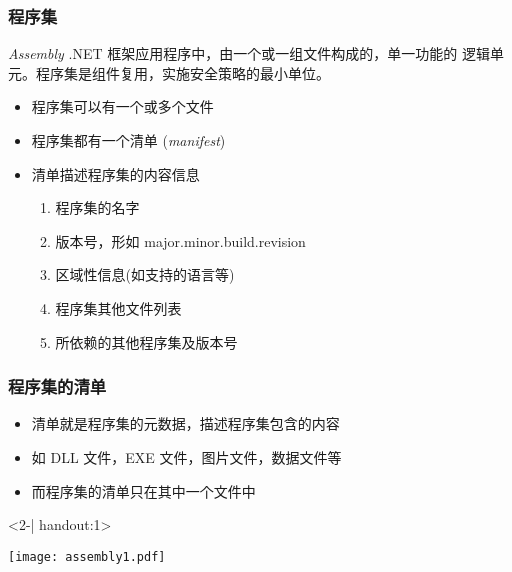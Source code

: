 \begin{frame}
\frametitle{程序集}
\begin{block}{\textit{Assembly}}
  \CJKindent \small .NET 框架应用程序中，由一个或一组文件构成的，单一功能的
  逻辑单元。程序集是组件复用，实施安全策略的最小单位。
\end{block}
\pause
\begin{itemize}
\item 程序集可以有一个或多个文件
\item 程序集都有一个{清单} (\textit{manifest}{})
\item 清单描述程序集的内容信息
  \begin{enumerate}
  \item 程序集的名字
  \item 版本号，形如 major.minor.build.revision
  \item 区域性信息(如支持的语言等)
  \item 程序集其他文件列表
  \item 所依赖的其他程序集及版本号
  \end{enumerate}
\end{itemize}
\end{frame}

\begin{frame}[t]
\frametitle{程序集的清单}

\begin{itemize}
\item 清单就是程序集的元数据，描述程序集包含的内容
\item 如 DLL 文件，EXE 文件，图片文件，数据文件等
\item 而程序集的清单只在其中一个文件中
\end{itemize}

\begin{onlyenv}<2-| handout:1>
  \begin{center}
    \texttt{[image: assembly1.pdf]}
  \end{center}
\end{onlyenv}
\end{frame}

